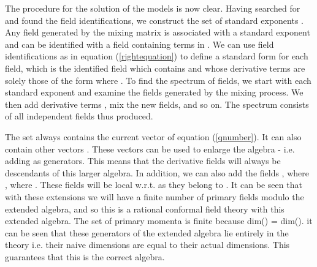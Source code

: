 \documentclass[a4paper,a4paper]{article}
\begin{document}
The procedure for the solution of the models is now clear. Having searched for and found the field identifications, we construct the set of standard exponents
\coordHE{}. Any field \coordHE{} generated by the mixing matrix is associated with a standard exponent \coordHE{} and 
can be identified with a field containing terms in \coordHE{}. We can use field identifications as in equation (\ref{rightequation})
to define a standard form for each field,
which is the identified field which contains \coordHE{} and whose derivative terms are solely those of the form 
\coordHE{} where \coordHE{}. To find the spectrum 
of fields, we start with each standard exponent and examine the fields generated by the mixing process.
We then add derivative terms \coordHE{}, mix the new fields, and so on. The spectrum consists of all
independent fields thus produced.

The set  \coordHE{} always contains the \coordHE{} current vector
\coordHE{} of equation (\ref{qnumber}). It can also contain other vectors \coordHE{}. These vectors can be used
to enlarge the algebra - i.e. adding \coordHE{} as generators. This means that the
derivative fields will always be descendants of this larger algebra. In addition, we can also add the fields
\coordHE{}, where \coordHE{}, where \coordHE{}. These fields will be local w.r.t. \coordHE{} as they belong to 
\myHighlight{$\gamma^*$}\coordHE{}. It can be seen that with these extensions we will have a finite number of primary fields modulo the extended algebra, and so 
this is a rational conformal field theory with this extended algebra. The set of primary momenta \coordHE{} is finite because
dim(\coordHE{}) = dim(\myHighlight{$\gamma^*$}\coordHE{}). it can be seen that these generators of the extended algebra lie entirely in the \coordHE{} theory i.e. 
their naive dimensions are equal to their actual dimensions. This guarantees that this is the correct algebra. 
\end{document}
